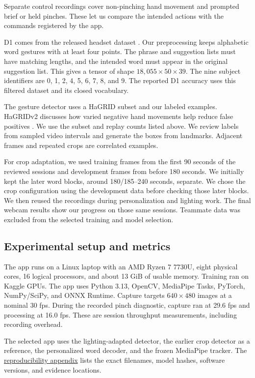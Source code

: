 \documentclass[preprint,12pt]{elsarticle}
\begin{document}
Separate control recordings cover non-pinching hand movement and prompted brief or held pinches. These let us compare the intended actions with the commands registered by the app.

D1 comes from the released headset dataset \cite{shen2023,shencode}. Our preprocessing keeps alphabetic word gestures with at least four points. The phrase and suggestion lists must have matching lengths, and the intended word must appear in the original suggestion list. This gives a tensor of shape $18{,}055\times50\times39$. The nine subject identifiers are 0, 1, 2, 4, 5, 6, 7, 8, and 9. The reported D1 accuracy uses this filtered dataset and its closed vocabulary.

The gesture detector uses a HaGRID subset and our labeled examples. HaGRIDv2 discusses how varied negative hand movements help reduce false positives \cite{hagridv2}. We use the subset and replay counts listed above. We review labels from sampled video intervals and generate the boxes from landmarks. Adjacent frames and repeated crops are correlated examples.

For crop adaptation, we used training frames from the first 90 seconds of the reviewed sessions and development frames from before 180 seconds. We initially kept the later word blocks, around 180/185--240 seconds, separate. We chose the crop configuration using the development data before checking those later blocks. We then reused the recordings during personalization and lighting work. The final webcam results show our progress on those same sessions. Teammate data was excluded from the selected training and model selection.

\subsection{Experimental setup and metrics}\label{sec:metrics}
The app runs on a Linux laptop with an AMD Ryzen 7 7730U, eight physical cores, 16 logical processors, and about 13 GiB of usable memory. Training ran on Kaggle GPUs. The app uses Python 3.13, OpenCV, MediaPipe Tasks, PyTorch, NumPy/SciPy, and ONNX Runtime. Capture targets $640\times480$ images at a nominal 30 fps. During the recorded pinch diagnostic, capture ran at 29.6 fps and processing at 16.0 fps. These are session throughput measurements, including recording overhead.

The selected app uses the lighting-adapted detector, the earlier crop detector as a reference, the personalized word decoder, and the frozen MediaPipe tracker. The \hyperref[app:reproducibility]{reproducibility appendix} lists the exact filenames, model hashes, software versions, and evidence locations.
\end{document}
